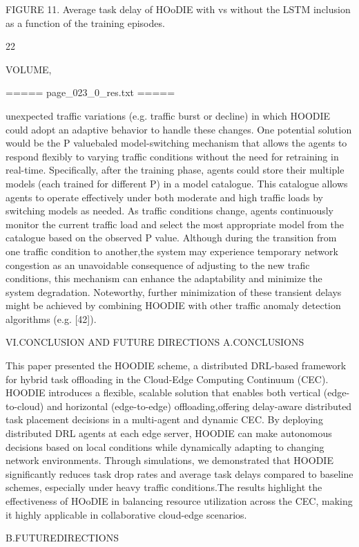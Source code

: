 \documentclass{article}
\begin{document}
FIGURE 11. Average task delay of HOoDIE with vs without the LSTM inclusion as a function of the training episodes.

22

VOLUME,

===== page\_023\_0\_res.txt =====


unexpected traffic variations (e.g. traffic burst or decline) in which HOODIE could adopt an adaptive behavior to handle these changes. One potential solution would be the P valuebaled model-switching mechanism that allows the agents to respond flexibly to varying traffic conditions without the need for retraining in real-time. Specifically, after the training phase, agents could store their multiple models (each trained for different P) in a model catalogue. This catalogue allows agents to operate effectively under both moderate and high traffic loads by switching models as needed. As traffic conditions change, agents continuously monitor the current traffic load and select the most appropriate model from the catalogue based on the observed P value. Although during the transition from one traffic condition to another,the system may experience temporary network congestion as an unavoidable consequence of adjusting to the new trafic conditions, this mechanism can enhance the adaptability and minimize the system degradation. Noteworthy, further minimization of these transient delays might be achieved by combining HOODIE with other traffic anomaly detection algorithms (e.g. [42]).

VI.CONCLUSION AND FUTURE DIRECTIONS A.CONCLUSIONS

This paper presented the HOODIE scheme, a distributed DRL-based framework for hybrid task offloading in the Cloud-Edge Computing Continuum (CEC). HOODIE introduces a flexible, scalable solution that enables both vertical (edge-to-cloud) and horizontal (edge-to-edge) offloading,offering delay-aware distributed task placement decisions in a multi-agent and dynamic CEC. By deploying distributed DRL agents at each edge server, HOODIE can make autonomous decisions based on local conditions while dynamically adapting to changing network environments. Through simulations, we demonstrated that HOODIE significantly reduces task drop rates and average task delays compared to baseline schemes, especially under heavy traffic conditions.The results highlight the effectiveness of HOoDIE in balancing resource utilization across the CEC, making it highly applicable in collaborative cloud-edge scenarios.

B.FUTUREDIRECTIONS
\end{document}
